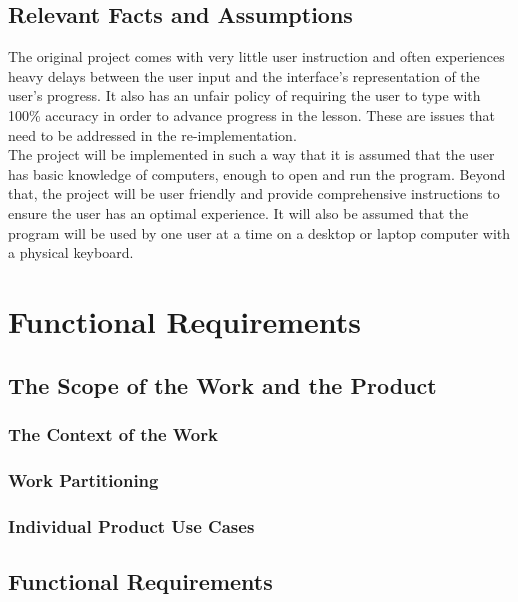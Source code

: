 \documentclass[12pt, titlepage]{article}
\begin{document}
\subsection{Relevant Facts and Assumptions}
\indent \indent The original project comes with very little user instruction and often experiences heavy delays between the user input and the interface's representation of the user's progress. It also has an unfair policy of requiring the user to type with 100\% accuracy in order to advance progress in the lesson. These are issues that need to be addressed in the re-implementation.
\\
\indent The project will be implemented in such a way that it is assumed that the user has basic knowledge of computers, enough to open and run the program. Beyond that, the project will be user friendly and provide comprehensive instructions to ensure the user has an optimal experience. It will also be assumed that the program will be used by one user at a time on a desktop or laptop computer with a physical keyboard.

\section{Functional Requirements}

\subsection{The Scope of the Work and the Product}

\subsubsection{The Context of the Work}

\subsubsection{Work Partitioning}

\subsubsection{Individual Product Use Cases}

\subsection{Functional Requirements}
\end{document}
